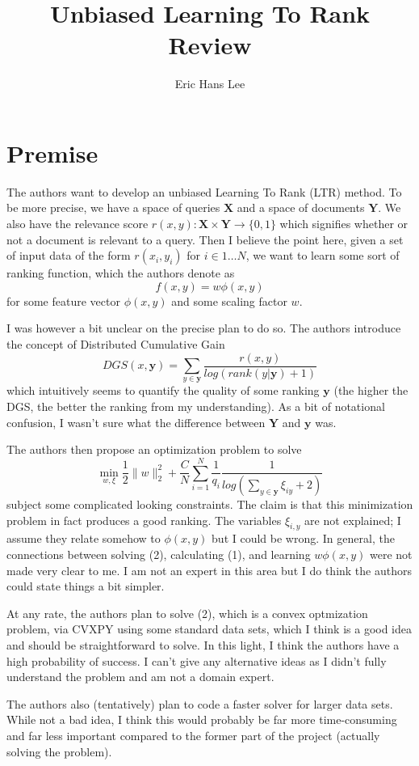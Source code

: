 

\title{Unbiased Learning To Rank Review}
\author{Eric Hans Lee}
\date{}


\maketitle
\section{Premise}
The authors want to develop an unbiased Learning To Rank (LTR) method. To be more precise, we have a space of queries $\textbf{X}$ and a space of documents $\textbf{Y}$. We also have the relevance score $r(x,y): \textbf{X} \times \textbf{Y} \rightarrow \{0,1\}$ which signifies whether or not a document is relevant to a query. Then I believe the point here, given a set of input data of the form $r(x_i,y_i)$ for $i \in {1 \dots N}$, we want to learn some sort of ranking function, which the authors denote as $$f(x,y)  = w\phi(x,y)$$ for some feature vector $\phi(x,y)$ and some scaling factor $w$. 

I was however a bit unclear on the precise plan to do so. The authors introduce the concept of Distributed Cumulative Gain
\begin{equation}
DGS(x,\textbf{y}) = \sum_{y \in \textbf{y}} \frac{r(x,y)}{log(rank(y|\textbf{y}) + 1)}
\end{equation}
which intuitively seems to quantify the quality of some ranking $\textbf{y}$ (the higher the DGS, the better the ranking from my understanding). As a bit of notational confusion, I wasn't sure what the difference between $\textbf{Y}$ and $\textbf{y}$ was. 

The authors then propose an optimization problem to solve
\begin{equation}
\min_{w,\xi} \frac{1}{2}\|w\|_2^2 + \frac{C}{N}\sum_{i = 1}^N \frac{1}{q_i}\frac{1}{log(\sum_{y \in\textbf{y}} \xi_{iy} + 2 )}
\end{equation}
subject some complicated looking constraints. The claim is that this minimization problem in fact produces a good ranking. The variables $\xi_{i,y}$ are not explained; I assume they relate somehow to $\phi(x,y)$ but I could be wrong. In general, the connections between solving (2), calculating (1), and learning $w\phi(x,y)$ were not made very clear to me. I am not an expert in this area but I do think the authors could state things a bit simpler.

At any rate, the authors plan to solve (2), which is a convex optmization problem, via CVXPY using some standard data sets, which I think is a good idea and should be straightforward to solve. In this light, I think the authors have a high probability of success. I can't give any alternative ideas as I didn't fully understand the problem and am not a domain expert.

The authors also (tentatively) plan to code a faster solver for larger data sets. While not a bad idea, I think this would probably be far more time-consuming and far less important compared to the former part of the project (actually solving the problem). 



